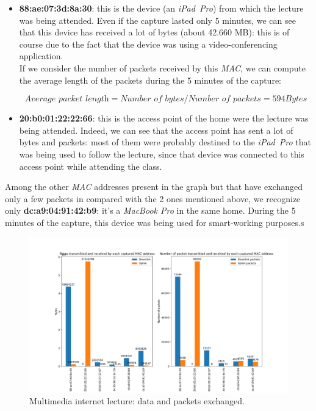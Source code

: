 \begin{itemize}
    \item \textbf{88:ae:07:3d:8a:30}: this is the device (an \textit{iPad\ Pro}) from which the lecture 
            was being attended. Even if the capture lasted only 5 minutes, we can see that this 
            device has received a lot of bytes (about 42.660 MB): this is of course due to the fact
            that the device was using a video-conferencing application.\\ 
            If we consider the number of packets received by this \textit{MAC}, we can compute the 
            average length of the packets during the 5 minutes of the capture:

            \begin{equation}
                \textit{Average packet length} = \textit{Number of bytes} / \textit{Number of packets} = 594 Bytes
            \end{equation}

    \item \textbf{20:b0:01:22:22:66}: this is the access point of the home were the lecture was being
            attended. Indeed, we can see that the access point has sent a lot of bytes and packets: 
            most of them were probably destined to the \textit{iPad\ Pro} that was being used to
            follow the lecture, since that device was connected to this access point while attending 
            the class. 
\end{itemize}

Among the other \textit{MAC} addresses present in the graph but that have exchanged only a few 
packets in compared with the 2 ones mentioned above, we recognize only \textbf{dc:a9:04:91:42:b9}: 
it's a \textit{MacBook Pro} in the same home. During the 5 minutes of the capture, this device was 
being used for smart-working purposes.s

\begin{figure}[h!]
    \centering
    \includegraphics[width=\linewidth]{Graphs/Multimedia_internet_bytes_packets.png}
    \caption{Multimedia internet lecture: data and packets exchanged.}
    \label{fig:Multimedia internet lecture: data and packets exchanged.}
\end{figure}


